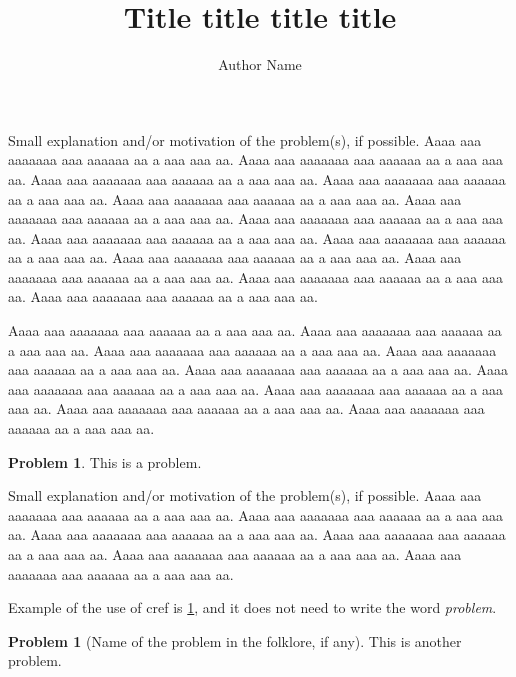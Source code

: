 \documentclass[a4paper,11pt]{amsart}
\theoremstyle{plain}
\theoremstyle{definition}
\newtheorem{problem}[theorem]{Problem}
\begin{document}
\author{Author Name}
\title{Title title title title}


\maketitle


Small explanation and/or motivation of the problem(s), if possible. \textcolor[rgb]{0.4,0.4,0.4}{Aaaa aaa aaaaaaa aaa aaaaaa aa a aaa aaa aa. Aaaa aaa aaaaaaa aaa aaaaaa aa a aaa aaa aa. Aaaa aaa aaaaaaa aaa aaaaaa aa a aaa aaa aa. Aaaa aaa aaaaaaa aaa aaaaaa aa a aaa aaa aa. Aaaa aaa aaaaaaa aaa aaaaaa aa a aaa aaa aa. Aaaa aaa aaaaaaa aaa aaaaaa aa a aaa aaa aa. Aaaa aaa aaaaaaa aaa aaaaaa aa a aaa aaa aa. Aaaa aaa aaaaaaa aaa aaaaaa aa a aaa aaa aa. Aaaa aaa aaaaaaa aaa aaaaaa aa a aaa aaa aa. Aaaa aaa aaaaaaa aaa aaaaaa aa a aaa aaa aa. Aaaa aaa aaaaaaa aaa aaaaaa aa a aaa aaa aa. Aaaa aaa aaaaaaa aaa aaaaaa aa a aaa aaa aa. Aaaa aaa aaaaaaa aaa aaaaaa aa a aaa aaa aa.} 

\textcolor[rgb]{0.4,0.4,0.4}{Aaaa aaa aaaaaaa aaa aaaaaa aa a aaa aaa aa. Aaaa aaa aaaaaaa aaa aaaaaa aa a aaa aaa aa. Aaaa aaa aaaaaaa aaa aaaaaa aa a aaa aaa aa. Aaaa aaa aaaaaaa aaa aaaaaa aa a aaa aaa aa. Aaaa aaa aaaaaaa aaa aaaaaa aa a aaa aaa aa. Aaaa aaa aaaaaaa aaa aaaaaa aa a aaa aaa aa. Aaaa aaa aaaaaaa aaa aaaaaa aa a aaa aaa aa. Aaaa aaa aaaaaaa aaa aaaaaa aa a aaa aaa aa. Aaaa aaa aaaaaaa aaa aaaaaa aa a aaa aaa aa.} 

\begin{problem}\label{prob:name}
This is a problem.
\end{problem}

Small explanation and/or motivation of the problem(s), if possible. \textcolor[rgb]{0.4,0.4,0.4}{Aaaa aaa aaaaaaa aaa aaaaaa aa a aaa aaa aa. Aaaa aaa aaaaaaa aaa aaaaaa aa a aaa aaa aa. Aaaa aaa aaaaaaa aaa aaaaaa aa a aaa aaa aa. Aaaa aaa aaaaaaa aaa aaaaaa aa a aaa aaa aa. Aaaa aaa aaaaaaa aaa aaaaaa aa a aaa aaa aa. Aaaa aaa aaaaaaa aaa aaaaaa aa a aaa aaa aa. }

Example of the use of cref is \cref{prob:name}, and it does not need to write the word \textsl{problem}.

\begin{problem}[Name of the problem in the folklore, if any]
This is another problem.
\end{problem}
\end{document}
